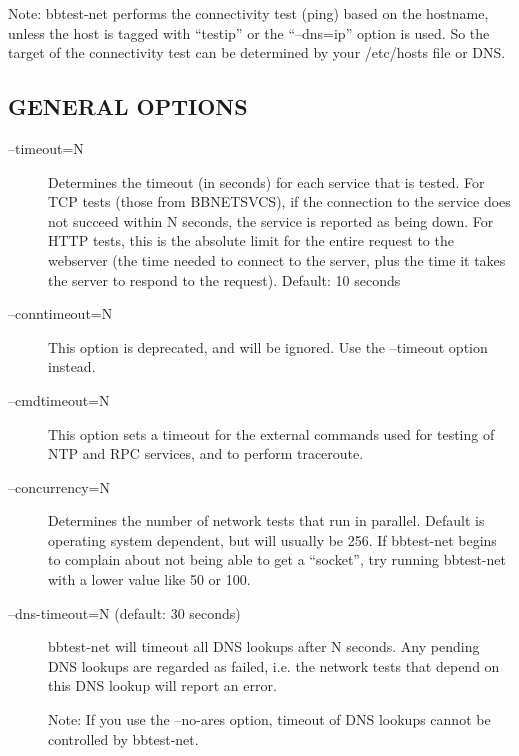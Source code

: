 

  Note: bbtest-net performs the connectivity test (ping) based on the
  hostname, unless the host is tagged with ``testip'' or the
  ``--dns=ip'' option is used. So the target of the connectivity test
  can be determined by your /etc/hosts file or DNS. 



 
\subsection{GENERAL OPTIONS}


\begin{description}

\item[--timeout=N] Determines the timeout (in seconds) for each
  service that is tested. For TCP tests (those from BBNETSVCS), if the
  connection to the service does not succeed within N seconds, the
  service is reported as being down. For HTTP tests, this is the
  absolute limit for the entire request to the webserver (the time
  needed to connect to the server, plus the time it takes the server
  to respond to the request). Default: 10 seconds 



 

\item[--conntimeout=N] This option is deprecated, and will be
  ignored. Use the --timeout option instead. 


 

\item[--cmdtimeout=N] This option sets a timeout for the external
  commands used for testing of NTP and RPC services, and to perform
  traceroute. 


 

\item[--concurrency=N] Determines the number of network tests that run
  in parallel. Default is operating system dependent, but will usually
  be 256. If bbtest-net begins to complain about not being able to get
  a ``socket'', try running bbtest-net with a lower value like 50 or
  100. 


 

\item[--dns-timeout=N (default: 30 seconds)] bbtest-net will timeout
  all DNS lookups after N seconds. Any pending DNS lookups are
  regarded as failed, i.e. the network tests that depend on this DNS
  lookup will report an error.  

 Note: If you use the --no-ares option, timeout of DNS lookups cannot
 be controlled by bbtest-net. 



\end{description}

